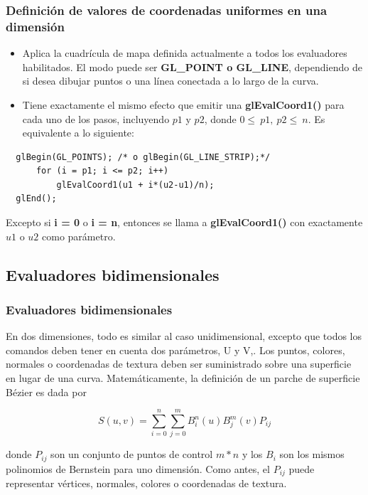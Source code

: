 \documentclass[10.5pt]{beamer}
\begin{document}
\begin{frame}[fragile]
 \frametitle{Definición de valores de coordenadas uniformes en una dimensión}

\begin{itemize}
\justifying
    \item Aplica la cuadrícula de mapa definida actualmente a todos los evaluadores habilitados. El modo puede ser \textbf{GL\_POINT o GL\_LINE}, dependiendo de si desea dibujar puntos o una línea conectada a lo largo de la curva.

    \item  Tiene exactamente el mismo efecto que emitir una \textbf{glEvalCoord1()} para cada uno de los pasos, incluyendo $p1$ y $p2$, donde $0\le\ p1,\ p2\le\ n$. Es equivalente a lo siguiente:
\end{itemize}

\begin{alertblock}{}
\small
\begin{verbatim}
  glBegin(GL_POINTS); /* o glBegin(GL_LINE_STRIP);*/
      for (i = p1; i <= p2; i++)
          glEvalCoord1(u1 + i*(u2-u1)/n);
  glEnd();
\end{verbatim}
\end{alertblock}
Excepto si \textbf{i = 0} o \textbf{i = n}, entonces se llama a \textbf{glEvalCoord1()} con exactamente $u1$ o $u2$ como parámetro.
\end{frame}

\subsection{Evaluadores bidimensionales}

\begin{frame}[fragile]
\frametitle{Evaluadores bidimensionales}

En dos dimensiones, todo es similar al caso unidimensional, excepto que todos los comandos deben
tener en cuenta dos parámetros, U y V,. Los puntos, colores, normales o coordenadas de textura deben ser
suministrado sobre una superficie en lugar de una curva. Matemáticamente, la definición de un parche de superficie Bézier es
dada por

\begin{block}

\begin{equation*}
    S(u,v)=\sum_{i=0}^{n}\sum_{j=0}^{m} B_{i}^{n}(u) B_{j}^{m}(v)P_{ij}
\end{equation*}

\end{block}

donde $P_{ij}$ son un conjunto de puntos de control $m*n$ y los $B_{i}$ son los mismos polinomios de Bernstein para uno
dimensión. Como antes, el $P_{ij}$ puede representar vértices, normales, colores o coordenadas de textura.
\end{frame}
\end{document}
